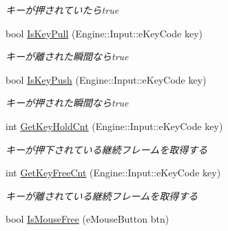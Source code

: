 \begin{DoxyCompactItemize}
\begin{DoxyCompactList}\small\item\em キーが押されていたらtrue \end{DoxyCompactList}\item 
bool \hyperlink{class_input_manager_a35a091d4deba839adbc4119796e7942c}{Is\+Key\+Pull} (Engine\+::\+Input\+::e\+Key\+Code key)\hypertarget{class_input_manager_a35a091d4deba839adbc4119796e7942c}{}\label{class_input_manager_a35a091d4deba839adbc4119796e7942c}

\begin{DoxyCompactList}\small\item\em キーが離された瞬間ならtrue \end{DoxyCompactList}\item 
bool \hyperlink{class_input_manager_a591e6e4c0644d0875b6a3fe4240a9fa2}{Is\+Key\+Push} (Engine\+::\+Input\+::e\+Key\+Code key)\hypertarget{class_input_manager_a591e6e4c0644d0875b6a3fe4240a9fa2}{}\label{class_input_manager_a591e6e4c0644d0875b6a3fe4240a9fa2}

\begin{DoxyCompactList}\small\item\em キーが押された瞬間ならtrue \end{DoxyCompactList}\item 
int \hyperlink{class_input_manager_a00f7496fc57f461bf8c0782a12771bc9}{Get\+Key\+Hold\+Cnt} (Engine\+::\+Input\+::e\+Key\+Code key)\hypertarget{class_input_manager_a00f7496fc57f461bf8c0782a12771bc9}{}\label{class_input_manager_a00f7496fc57f461bf8c0782a12771bc9}

\begin{DoxyCompactList}\small\item\em キーが押下されている継続フレームを取得する \end{DoxyCompactList}\item 
int \hyperlink{class_input_manager_a1d228312a8d269347a0a0346e8897ea9}{Get\+Key\+Free\+Cnt} (Engine\+::\+Input\+::e\+Key\+Code key)\hypertarget{class_input_manager_a1d228312a8d269347a0a0346e8897ea9}{}\label{class_input_manager_a1d228312a8d269347a0a0346e8897ea9}

\begin{DoxyCompactList}\small\item\em キーが離されている継続フレームを取得する \end{DoxyCompactList}\item 
bool \hyperlink{class_input_manager_addbd2d5a46ff66ec6dd759961bcca408}{Is\+Mouse\+Free} (e\+Mouse\+Button btn)\hypertarget{class_input_manager_addbd2d5a46ff66ec6dd759961bcca408}{}\label{class_input_manager_addbd2d5a46ff66ec6dd759961bcca408}


\end{DoxyCompactItemize}
